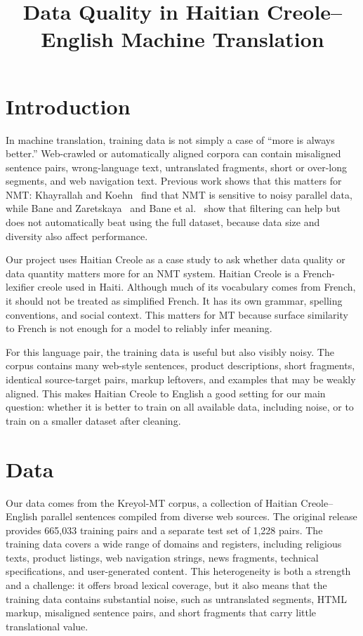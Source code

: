 \documentclass[11pt]{article}
\title{Data Quality in Haitian Creole--English Machine Translation}
\author{}
\date{}
\begin{document}
\maketitle

\section{Introduction}

In machine translation, training data is not simply a case of ``more is always better.'' Web-crawled or automatically aligned corpora can contain misaligned sentence pairs, wrong-language text, untranslated fragments, short or over-long segments, and web navigation text. Previous work shows that this matters for NMT: Khayrallah and Koehn~\cite{khayrallah-koehn-2018-noise} find that NMT is sensitive to noisy parallel data, while Bane and Zaretskaya~\cite{bane-zaretskaya-2021-filtering} and Bane et al.~\cite{bane-etal-2022-filtering} show that filtering can help but does not automatically beat using the full dataset, because data size and diversity also affect performance.

Our project uses Haitian Creole as a case study to ask whether data quality or data quantity matters more for an NMT system. Haitian Creole is a French-lexifier creole used in Haiti. Although much of its vocabulary comes from French, it should not be treated as simplified French. It has its own grammar, spelling conventions, and social context. This matters for MT because surface similarity to French is not enough for a model to reliably infer meaning.

For this language pair, the training data is useful but also visibly noisy. The corpus contains many web-style sentences, product descriptions, short fragments, identical source-target pairs, markup leftovers, and examples that may be weakly aligned. This makes Haitian Creole to English a good setting for our main question: whether it is better to train on all available data, including noise, or to train on a smaller dataset after cleaning.

\section{Data}

Our data comes from the Kreyol-MT corpus, a collection of Haitian Creole--English parallel sentences compiled from diverse web sources. The original release provides 665,033 training pairs and a separate test set of 1,228 pairs. The training data covers a wide range of domains and registers, including religious texts, product listings, web navigation strings, news fragments, technical specifications, and user-generated content. This heterogeneity is both a strength and a challenge: it offers broad lexical coverage, but it also means that the training data contains substantial noise, such as untranslated segments, HTML markup, misaligned sentence pairs, and short fragments that carry little translational value.
\end{document}
